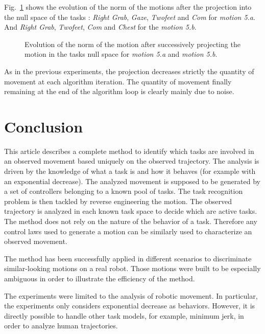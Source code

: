 \documentclass[journal]{IEEEtran}
\begin{document}
Fig.~\ref{fig:exp6:PqdotNorms5} shows the evolution of the norm of the motions after the projection
into the null space of the tasks : \emph{Right Grab},  \emph{Gaze}, \emph{Twofeet} and \emph{Com} for
\emph{motion 5.a}. And \emph{Right Grab}, \emph{Twofeet}, \emph{Com} and \emph{Chest} for the
\emph{motion 5.b}.
\begin{figure}[t]
  \centering
  \subfigure[Motion 5.a]{
  \resizebox{.48\textwidth}{!} {
    
  }
  }
  \subfigure[Motion 5.b]{
  \resizebox{.48\textwidth}{!} {
    
  }
}
\caption{Evolution of the norm of the motion after successively projecting the motion in the tasks null space for
\emph{motion 5.a} and \emph{motion 5.b}.}
\label{fig:exp6:PqdotNorms5}
\end{figure}
As in the previous experiments, the projection decreases strictly the quantity of movement
at each algorithm iteration. The quantity of movement finally remaining at the end of 
the algorithm loop is clearly mainly due to noise.



\section{Conclusion}
This article describes a complete method to identify which tasks are involved in an observed movement
based uniquely on the observed trajectory.
The analysis is driven by the knowledge
of what a task is and how it behaves (for example with an exponential decrease). 
The analyzed movement is supposed to be generated by a set of 
controllers belonging to a known pool of tasks. 
The task recognition problem is then tackled by reverse engineering the motion.
The observed trajectory is analyzed
in each known task space to decide which are active tasks.
The method does not rely on the nature of the behavior of a task. Therefore
any control laws used to generate a motion can be similarly
used to characterize an observed movement.

The method has been successfully applied in different
scenarios to discriminate similar-looking motions on a real robot. Those motions were built to be especially
ambiguous in order to illustrate the efficiency of the method.

The experiments were limited to the analysis of robotic movement. In particular,
the experiments only considers exponential decrease as behaviors.
However, it is directly possible to handle other task models, for example, minimum jerk,
in order to analyze human trajectories.
\end{document}
